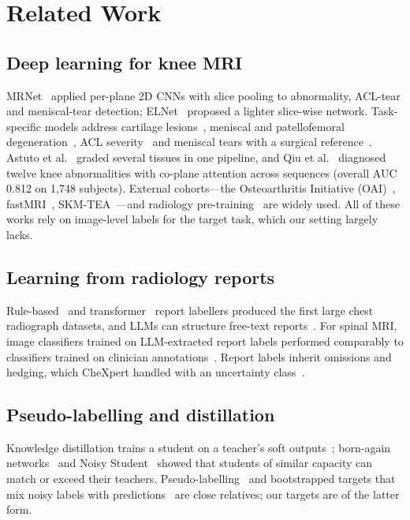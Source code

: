 \documentclass{ieeeaccess}
\begin{document}
\section{Related Work}
\label{sec:related}

\subsection{Deep learning for knee MRI}
MRNet~\cite{bien2018mrnet} applied per-plane 2D CNNs with slice pooling to abnormality, ACL-tear and meniscal-tear
detection; ELNet~\cite{tsai2020elnet} proposed a lighter slice-wise network. Task-specific models address cartilage
lesions~\cite{liu2018cartilage}, meniscal and patellofemoral degeneration~\cite{pedoia2019meniscus}, ACL
severity~\cite{namiri2020acl} and meniscal tears with a surgical reference~\cite{fritz2020meniscus,roblot2019meniscus}.
Astuto et al.~\cite{astuto2021knee} graded several tissues in one pipeline, and Qiu et al.~\cite{qiu2024coplane}
diagnosed twelve knee abnormalities with co-plane attention across sequences (overall AUC 0.812 on 1,748 subjects).
External cohorts---the Osteoarthritis Initiative (OAI)~\cite{peterfy2008oai}, fastMRI~\cite{zbontar2018fastmri},
SKM-TEA~\cite{desai2021skmtea}---and radiology pre-training~\cite{mei2022radimagenet} are widely used. All of these
works rely on image-level labels for the target task, which our setting largely lacks.

\subsection{Learning from radiology reports}
Rule-based~\cite{wang2017chestxray8,irvin2019chexpert} and transformer~\cite{smit2020chexbert} report labellers
produced the first large chest radiograph datasets, and LLMs can structure free-text reports~\cite{adams2023gpt4}. For
spinal MRI, image classifiers trained on LLM-extracted report labels performed comparably to classifiers trained on
clinician annotations~\cite{park2024spinal}. Report labels inherit omissions and hedging, which CheXpert handled with an
uncertainty class~\cite{irvin2019chexpert}.

\subsection{Pseudo-labelling and distillation}
Knowledge distillation trains a student on a teacher's soft outputs~\cite{hinton2015distilling}; born-again
networks~\cite{furlanello2018born} and Noisy Student~\cite{xie2020noisy} showed that students of similar capacity can
match or exceed their teachers. Pseudo-labelling~\cite{lee2013pseudo} and bootstrapped targets that mix noisy labels with
predictions~\cite{reed2015bootstrapping} are close relatives; our targets are of the latter form.
\end{document}
